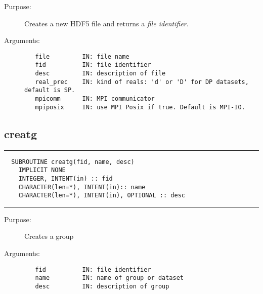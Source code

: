 \documentclass[a4paper]{article}
\begin{document}
\begin{description}
\item[Purpose:] \mbox{}

Creates a new HDF5 file and returns a {\itshape file identifier\/}.



\item[Arguments:] \mbox{}

\begin{verbatim}
   file         IN: file name
   fid          IN: file identifier
   desc         IN: description of file
   real_prec    IN: kind of reals: 'd' or 'D' for DP datasets, default is SP.
   mpicomm      IN: MPI communicator
   mpiposix     IN: use MPI Posix if true. Default is MPI-IO.

\end{verbatim}


\end{description}





\subsection{creatg}

\par
\addvspace{\medskipamount}
\nopagebreak\hrule
\begin{verbatim}
  SUBROUTINE creatg(fid, name, desc)
    IMPLICIT NONE
    INTEGER, INTENT(in) :: fid
    CHARACTER(len=*), INTENT(in):: name
    CHARACTER(len=*), INTENT(in), OPTIONAL :: desc
\end{verbatim}
\nopagebreak\hrule
\addvspace{\medskipamount}

\begin{description}
\item[Purpose:] \mbox{}

Creates a group

\item[Arguments:] \mbox{}

\begin{verbatim}
   fid          IN: file identifier
   name         IN: name of group or dataset
   desc         IN: description of group

\end{verbatim}


\end{description}
\end{document}
